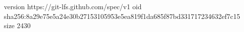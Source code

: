 version https://git-lfs.github.com/spec/v1
oid sha256:8a29e75e5a24e30b27153105953e5ea819f1da685f87bd331717234632ef7c15
size 2430
